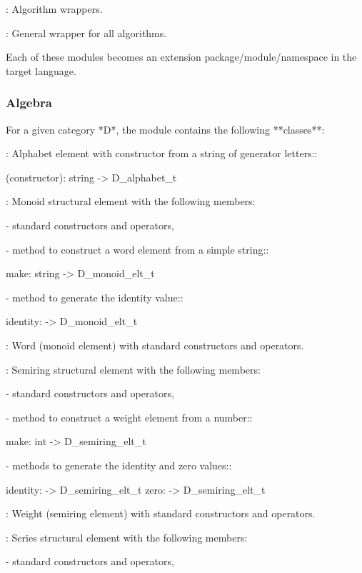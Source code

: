 :
   Algorithm wrappers.

:
   General wrapper for all algorithms.

Each of these modules becomes an extension package/module/namespace in
the target language.

\subsubsection{Algebra}

For  a   given  category  *D*,   the  module  
contains the following **classes**:

: 
     Alphabet element with constructor from a string of generator 
     letters::

        (constructor): string -> D_alphabet_t

:
     Monoid structural element with the following members:

     - standard \Vauc constructors and operators,
     
     - method to construct a word element from a simple string::

        make: string -> D_monoid_elt_t

     - method to generate the identity value::

        identity: -> D_monoid_elt_t 

: 
     Word  (monoid element) with  standard \Vauc  constructors and
     operators.


:
      Semiring structural element with the following members:

      - standard \Vauc constructors and operators,

      - method to construct a weight element from a number::

         make: int -> D_semiring_elt_t

      - methods to generate the identity and zero values::

         identity: -> D_semiring_elt_t
         zero: -> D_semiring_elt_t

: 
     Weight  (semiring element)  with standard  \Vauc constructors
     and operators.

:
      Series structural element with the following members:

      - standard \Vauc constructors and operators,

